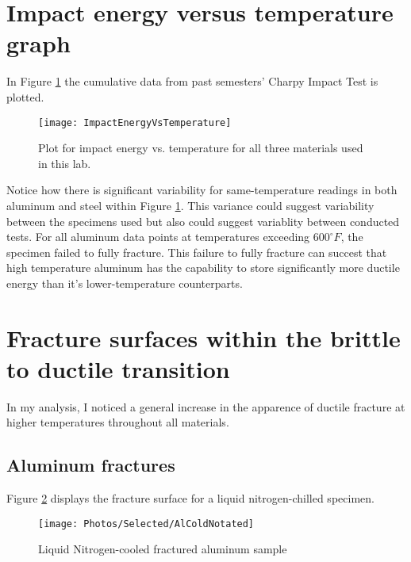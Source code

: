 \documentclass{article}
\newcommand{\YearPath}{../../../LatexConfig} %
\newcommand{\SemesterPath}{../../LatexConfig} %
\newcommand{\ClassPath}{../LatexConfig} %
\begin{document}




\section{Impact energy versus temperature graph}
In Figure \ref{fig:mainGraph} the cumulative data from past semesters' Charpy Impact Test is plotted.

\begin{figure}[H]
\texttt{[image: ImpactEnergyVsTemperature]}
\caption{Plot for impact energy vs. temperature for all three materials used in this lab.}
\label{fig:mainGraph}
\end{figure}

Notice how there is significant variability for same-temperature readings in both aluminum and steel within Figure \ref{fig:mainGraph}. This variance could suggest variability between the specimens used but also could suggest variablity between conducted tests. For all aluminum data points at temperatures exceeding $600^\circ F$, the specimen failed to fully fracture. This failure to fully fracture can succest that high temperature aluminum has the capability to store significantly more ductile energy than it's lower-temperature counterparts.


\section{Fracture surfaces within the brittle to ductile transition}

In my analysis, I noticed a general increase in the apparence of ductile fracture at higher temperatures throughout all materials.

\subsection{Aluminum fractures}

Figure \ref{fig:AlCold} displays the fracture surface for a liquid nitrogen-chilled specimen.

\begin{figure}[H]
\centering
\texttt{[image: Photos/Selected/AlColdNotated]}
\caption{Liquid Nitrogen-cooled fractured aluminum sample}
\label{fig:AlCold}
\end{figure}
\end{document}
